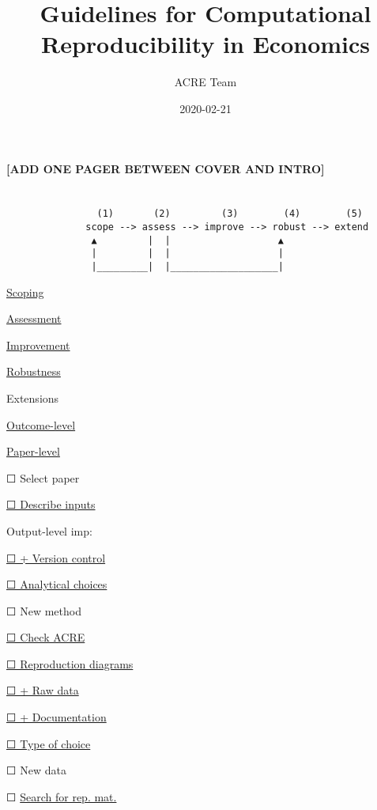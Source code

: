 \documentclass[]{book}
\title{Guidelines for Computational Reproducibility in Economics}
\author{ACRE Team}
\date{2020-02-21}
\begin{document}
\maketitle

{
\setcounter{tocdepth}{1}
\tableofcontents
}
\textbf{{[}ADD ONE PAGER BETWEEN COVER AND INTRO{]}}

\hypertarget{section}{%
\chapter*{}\label{section}}

\begin{verbatim}
                (1)       (2)         (3)        (4)        (5)
              scope --> assess --> improve --> robust --> extend
               ▲         |  |                   ▲
               |         |  |                   |
               |_________|  |___________________|
\end{verbatim}

\protect\hyperlink{scoping}{Scoping}

\protect\hyperlink{assessment}{Assessment}

\protect\hyperlink{improvements}{Improvement}

\protect\hyperlink{robust}{Robustness}

Extensions

\protect\hyperlink{improvements}{Outcome-level}

\protect\hyperlink{paper-level}{Paper-level}

☐ Select paper

\protect\hyperlink{describe-inputs}{☐ Describe inputs}

Output-level imp:

\protect\hyperlink{paper-level}{☐ + Version control}

\protect\hyperlink{id-analy}{☐ Analytical choices}

☐ New method

\protect\hyperlink{check-acre}{☐ Check ACRE}

\protect\hyperlink{diagram}{☐ Reproduction diagrams}

\protect\hyperlink{rd}{☐ + Raw data}

\protect\hyperlink{paper-level}{☐ + Documentation}

\protect\hyperlink{id-type}{☐ Type of choice}

☐ New data

☐ \protect\hyperlink{verify-rep-mat}{Search for rep. mat.}
\end{document}
